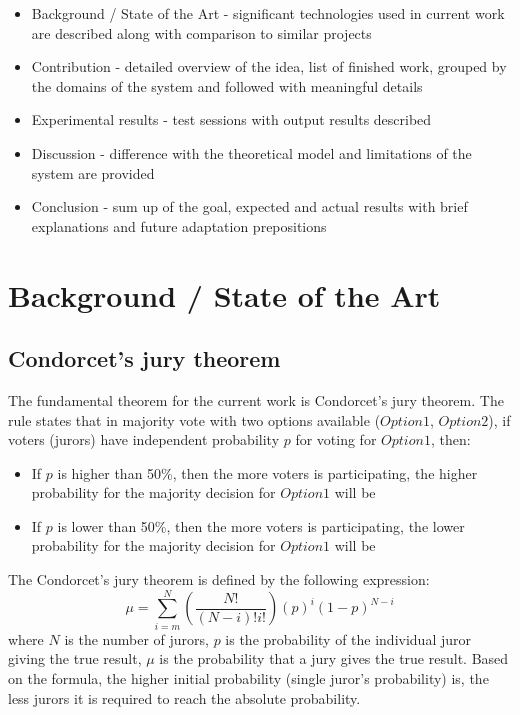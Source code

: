 \documentclass[12pt]{article}
\begin{document}
\begin{itemize}
\item Background / State of the Art - significant technologies used in current work are described along with comparison to similar projects
\item Contribution - detailed overview of the idea, list of finished work, grouped by the domains of the system and followed with meaningful details
\item Experimental results - test sessions with output results described
\item Discussion - difference with the theoretical model and limitations of the system are provided
\item Conclusion - sum up of the goal, expected and actual results with brief explanations and future adaptation prepositions
\end{itemize}

\newpage
\section{Background / State of the Art} 

\subsection{Condorcet's jury theorem}
The fundamental theorem for the current work is Condorcet's jury theorem. The rule states that in majority vote with two options available ($Option1$, $Option2$), if voters (jurors) have independent probability $p$ for voting for $Option1$, then:
\begin{itemize}
\item If $p$ is higher than 50\%, then the more voters is participating, the higher probability for the majority decision for $Option1$ will be
\item If $p$ is lower than 50\%, then the more voters is participating, the lower probability for the majority decision for $Option1$ will be
\end{itemize}
The Condorcet's jury theorem is defined by the following expression:
\[ \mu = \sum_{i=m}^{N} (\frac{N!}{(N-i)!i!})(p)^i(1-p)^{N-i} \]
where $N$ is the number of jurors, $p$ is the probability of the individual juror giving the true result, $\mu$ is the probability that a jury gives the true result.
Based on the formula, the higher initial probability (single juror's probability) is, the less jurors it is required to reach the absolute probability.
\end{document}
